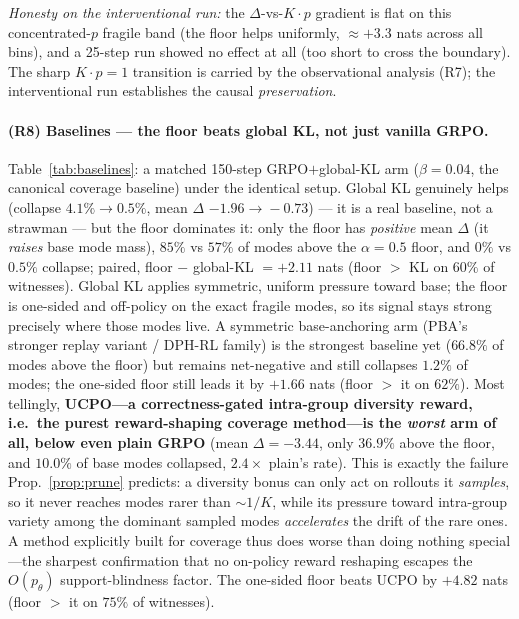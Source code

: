 \documentclass[11pt]{article}
\theoremstyle{definition}
\begin{document}
\emph{Honesty on the interventional run:} the $\Delta$-vs-$K\!\cdot\!p$ gradient is flat on this
concentrated-$p$ fragile band (the floor helps uniformly, $\approx+3.3$ nats across all bins), and a
25-step run showed no effect at all (too short to cross the boundary). The sharp $K\!\cdot\!p{=}1$
transition is carried by the observational analysis (R7); the interventional run establishes the
causal \emph{preservation}.

\paragraph{(R8) Baselines --- the floor beats global KL, not just vanilla GRPO.}
Table~\ref{tab:baselines}: a matched 150-step GRPO$+$global-KL arm ($\beta{=}0.04$, the canonical
coverage baseline) under the identical setup. Global KL genuinely helps (collapse $4.1\%\!\to\!0.5\%$,
mean $\Delta$ $-1.96\!\to\!-0.73$) --- it is a real baseline, not a strawman --- but the floor
dominates it: only the floor has \emph{positive} mean $\Delta$ (it \emph{raises} base mode mass),
$85\%$ vs $57\%$ of modes above the $\alpha{=}0.5$ floor, and $0\%$ vs $0.5\%$ collapse; paired,
floor $-$ global-KL $= +2.11$ nats (floor $>$ KL on $60\%$ of witnesses). Global KL applies symmetric,
uniform pressure toward base; the floor is one-sided and off-policy on the exact fragile modes, so its
signal stays strong precisely where those modes live. A symmetric base-anchoring arm (PBA's stronger
replay variant / DPH-RL family) is the strongest baseline yet ($66.8\%$ of modes above the floor) but
remains net-negative and still collapses $1.2\%$ of modes; the one-sided floor still leads it by
$+1.66$ nats (floor $>$ it on $62\%$). Most tellingly, \textbf{UCPO---a correctness-gated intra-group
diversity reward, i.e.\ the purest reward-shaping coverage method---is the \emph{worst} arm of all,
below even plain GRPO} (mean $\Delta=-3.44$, only $36.9\%$ above the floor, and $10.0\%$ of base modes
collapsed, $2.4\times$ plain's rate). This is exactly the failure Prop.~\ref{prop:prune} predicts: a
diversity bonus can only act on rollouts it \emph{samples}, so it never reaches modes rarer than
$\sim 1/K$, while its pressure toward intra-group variety among the dominant sampled modes
\emph{accelerates} the drift of the rare ones. A method explicitly built for coverage thus does worse
than doing nothing special---the sharpest confirmation that no on-policy reward reshaping escapes the
$O(p_\theta)$ support-blindness factor. The one-sided floor beats UCPO by $+4.82$ nats (floor $>$ it on
$75\%$ of witnesses).
\end{document}
